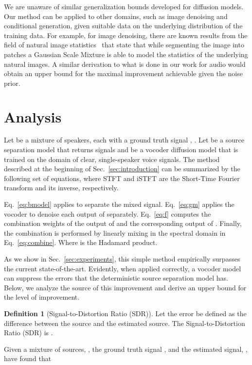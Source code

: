 \documentclass{article}
\theoremstyle{plain}
\theoremstyle{definition}
\newtheorem{definition}[theorem]{Definition}
\theoremstyle{remark}
\begin{document}
We are unaware of similar generalization bounds developed for diffusion models. Our method can be applied to other domains, such as image denoising and conditional generation, given suitable data on the underlying distribution of the training data. For example, for image denoising, there are known results from the field of natural image statistics~\cite{weiss2007makes} that state that while segmenting the image into patches a Gaussian Scale Mixture is able to model the statistics of the underlying natural images. A similar derivation to what is done in our work for audio would obtain an upper bound for the maximal improvement achievable given the noise prior.


\section{Analysis}

Let  be a mixture of  speakers, each with a ground truth signal , . Let  be a source separation model that returns  signals and  be a vocoder diffusion model that is trained on the domain of clear, single-speaker voice signals. The method described at the beginning of Sec.~\ref{sec:introduction} can be summarized by the following set of equations, where STFT and iSTFT
are the Short-Time Fourier transform and its inverse, respectively.





Eq.~\ref{eq:bmodel} applies  to separate the mixed signal. Eq.~\ref{eq:gm} applies the vocoder to denoise each output of  separately. Eq.~\ref{eq:f} computes the combination weights of the output of  and the corresponding output of . Finally, the combination is performed by linearly mixing in the spectral domain in Eq.~\ref{eq:combine}. Where  is the Hadamard product.

As we show in Sec.~\ref{sec:experiments}, this simple method empirically surpasses the current state-of-the-art. Evidently, when applied correctly, a vocoder model can suppress the errors that the deterministic source separation model has. Below, we analyze the source of this improvement and derive an upper bound for the level of improvement. 

\begin{definition}[Signal-to-Distortion Ratio (SDR)]
Let the error  be defined as the difference between the source and the estimated source. The Signal-to-Distortion Ratio (SDR) is .
\end{definition}
Given a mixture of sources, , the ground truth signal , and the estimated signal, , \cite{sepit} have found that 
\end{document}
